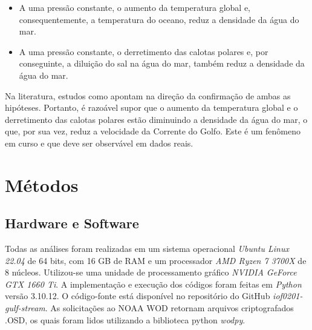 \documentclass[journal]{IEEEtran}
\begin{document}
        \begin{itemize}
            \item A uma pressão constante, o aumento da temperatura global e, consequentemente, a temperatura do oceano, reduz a densidade da água do mar.
            \item A uma pressão constante, o derretimento das calotas polares e, por conseguinte, a diluição do sal na água do mar, também reduz a densidade da água do mar.
        \end{itemize}
        Na literatura, estudos como \cite{Bromley2018,Cheng2019} apontam na direção da confirmação de ambas as hipóteses. Portanto, é razoável supor que o aumento da temperatura global e o derretimento das calotas polares estão diminuindo a densidade da água do mar, o que, por sua vez, reduz a velocidade da Corrente do Golfo. Este é um fenômeno em curso e que deve ser observável em dados reais.

    
    \section{Métodos}
        \subsection{Hardware e Software}
            Todas as análises foram realizadas em um sistema operacional \textit{Ubuntu Linux 22.04} de 64 bits, com 16 GB de RAM e um processador \textit{AMD Ryzen 7 3700X} de 8 núcleos. Utilizou-se uma unidade de processamento gráfico \textit{NVIDIA GeForce GTX 1660 Ti}. A implementação e execução dos códigos foram feitas em \textit{Python} versão 3.10.12. O código-fonte está disponível no repositório do GitHub \textit{iof0201-gulf-stream}\cite{iof0201_gulf_stream_2024}. As solicitações ao NOAA WOD retornam arquivos criptografados .OSD, os quais foram lidos utilizando a biblioteca python \textit{wodpy}.
\end{document}

